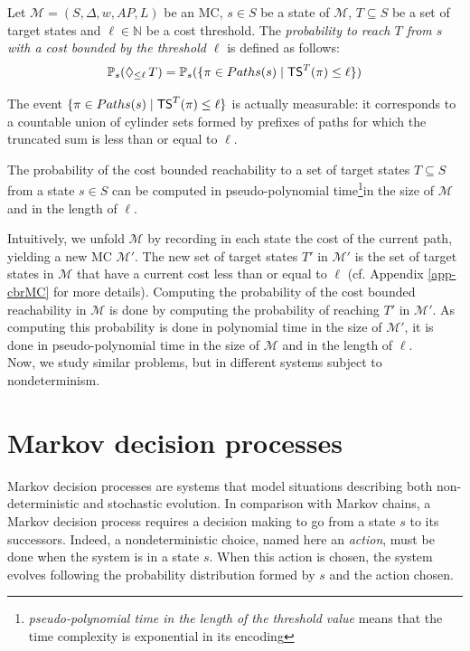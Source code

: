 \begin{definition}
	Let \sloppy $\mathcal{M} = (S, \Delta, w, AP, L)$ be an MC, $s \in S$ be a state of $\mathcal{M}$, $T \subseteq S$ be a set of target states and $\ell \in \mathbb{N}$ be a cost threshold.
  The \textit{probability to reach $T$ from $s$ with a cost bounded by the threshold $\ell$} is defined as follows:
	\[
    \mathbb{P}_s(\Diamond_{\leq \ell}\, T) = \mathbb{P}_s(\{\pi \in Paths(s) \; | \; \text{\sffamily TS}^T(\pi) \leq \ell \})
  \]
\end{definition}
The event $\{\pi \in Paths(s) \; | \; \text{\sffamily TS}^T(\pi) \leq \ell \}$ is actually measurable: it corresponds to a countable union of cylinder sets formed by prefixes of paths for which the truncated sum is less than or equal to $\ell$.%
\begin{theorem} \label{cost-bounded-thm}
  The probability of the cost bounded reachability to a set of target states $T \subseteq S$ from a state $s \in S$ can be computed in pseudo-polynomial time\footnote{\textit{pseudo-polynomial time in the length of the threshold value} means that the time complexity is exponential in its encoding}in the size of $\mathcal{M}$ and in the length of $\ell$.
\end{theorem}

Intuitively, we unfold $\mathcal{M}$ by recording in each state the cost of the
current path, yielding a new MC $\mathcal{M}'$. The new set of target states $T'$ in $\mathcal{M}'$ is the set of
target states in $\mathcal{M}$ that have a current cost less than or equal to $\ell$ (cf.
Appendix \ref{app-cbrMC} for more details).
Computing the probability of the cost bounded reachability in $\mathcal{M}$ is done by computing the probability of reaching $T'$ in $\mathcal{M}'$.
As computing this probability is done in polynomial time in the size of $\mathcal{M}'$, it is done in pseudo-polynomial time in the size of $\mathcal{M}$ and in the length of $\ell$.
\\

Now, we study similar problems, but in different systems subject to nondeterminism.

\section{Markov decision processes}
Markov decision processes are systems that model situations describing both non-deterministic and stochastic evolution.
In comparison with Markov chains, a Markov decision process requires a decision making to go from a state $s$ to its successors.
Indeed, a nondeterministic choice, named here an \textit{action}, must be done when the system is in a state $s$.
When this action is chosen, the system evolves following the probability distribution formed by $s$ and the action chosen.

